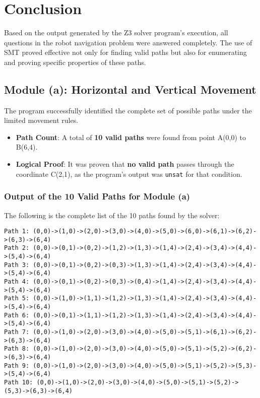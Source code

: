 \documentclass[11pt,a4paper
]{article}
\begin{document}
\newpage
\section*{Conclusion}
Based on the output generated by the Z3 solver program's execution, all questions in the robot navigation problem were answered completely. The use of SMT proved effective not only for finding valid paths but also for enumerating and proving specific properties of these paths.

\subsection*{Module (a): Horizontal and Vertical Movement}
The program successfully identified the complete set of possible paths under the limited movement rules.

\begin{itemize}
  \item \textbf{Path Count}: A total of \textbf{10 valid paths} were found from point A(0,0) to B(6,4).
  \item \textbf{Logical Proof}: It was proven that \textbf{no valid path} passes through the coordinate C(2,1), as the program's output was \texttt{unsat} for that condition.
\end{itemize}

\subsubsection*{Output of the 10 Valid Paths for Module (a)}
The following is the complete list of the 10 paths found by the solver:
{\small
\begin{verbatim}
Path 1: (0,0)->(1,0)->(2,0)->(3,0)->(4,0)->(5,0)->(6,0)->(6,1)->(6,2)->(6,3)->(6,4)
Path 2: (0,0)->(0,1)->(0,2)->(1,2)->(1,3)->(1,4)->(2,4)->(3,4)->(4,4)->(5,4)->(6,4)
Path 3: (0,0)->(0,1)->(0,2)->(0,3)->(1,3)->(1,4)->(2,4)->(3,4)->(4,4)->(5,4)->(6,4)
Path 4: (0,0)->(0,1)->(0,2)->(0,3)->(0,4)->(1,4)->(2,4)->(3,4)->(4,4)->(5,4)->(6,4)
Path 5: (0,0)->(1,0)->(1,1)->(1,2)->(1,3)->(1,4)->(2,4)->(3,4)->(4,4)->(5,4)->(6,4)
Path 6: (0,0)->(0,1)->(1,1)->(1,2)->(1,3)->(1,4)->(2,4)->(3,4)->(4,4)->(5,4)->(6,4)
Path 7: (0,0)->(1,0)->(2,0)->(3,0)->(4,0)->(5,0)->(5,1)->(6,1)->(6,2)->(6,3)->(6,4)
Path 8: (0,0)->(1,0)->(2,0)->(3,0)->(4,0)->(5,0)->(5,1)->(5,2)->(6,2)->(6,3)->(6,4)
Path 9: (0,0)->(1,0)->(2,0)->(3,0)->(4,0)->(5,0)->(5,1)->(5,2)->(5,3)->(5,4)->(6,4)
Path 10: (0,0)->(1,0)->(2,0)->(3,0)->(4,0)->(5,0)->(5,1)->(5,2)->(5,3)->(6,3)->(6,4)
\end{verbatim}
}
\end{document}
